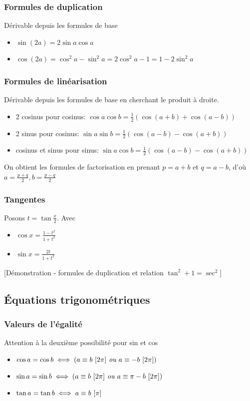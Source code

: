 \documentclass[openany]{book}
\begin{document}
\subsubsection{Formules de duplication}
Dérivable depuis les formules de base
\begin{itemize}
    \item $ \sin{(2a)} = 2\sin{a}\cos{a} $
    \item $ \cos{(2a)} = \cos^2{a} - \sin^2{a} = 2\cos^2{a} -1 = 1- 2\sin^2{a} $
\end{itemize}

\subsubsection{Formules de linéarisation}
Dérivable depuis les formules de base en cherchant le produit à droite.
\begin{itemize}
    \item 2 cosinus pour cosinus: $ \cos{a}\cos{b} = \frac{1}{2}(\cos{(a+b)}+\cos{(a-b)})  $
    \item 2 sinus pour cosinus: $ \sin{a}\sin{b} = \frac{1}{2}(\cos{(a-b)}-\cos{(a+b)}) $
    \item cosinus et sinus pour sinus: $ \sin{a}\cos{b} = \frac{1}{2}(\cos{(a-b)}-\cos{(a+b)}) $
\end{itemize}

On obtient les formules de factorisation en prenant $ p = a+b $ et $ q = a-b $, d'où $ a = \frac{p+q}{2}, b = \frac{p-q}{2} $

\subsubsection{Tangentes}
Posons $ t=\tan{\frac{x}{2}} $. Avec 
\begin{itemize}
    \item $ \cos{x} = \frac{1-t^2}{1+t^2} $
    \item $ \sin{x} = \frac{2t}{1+t^2} $
\end{itemize}

[Démonstration - formules de duplication et relation $\tan^2+1=\sec^2$]

\subsection{Équations trigonométriques}
\subsubsection{Valeurs de l'égalité}
Attention à la deuxième possibilité pour sin et cos
\begin{itemize}
    \item $ \cos{a} = \cos{b} \iff (a \equiv b \text{ } [2\pi] \textit{ ou } a \equiv -b \text{ } [2\pi]) $
    \item $ \sin{a} = \sin{b} \iff (a \equiv b \text{ } [2\pi] \textit{ ou } a \equiv \pi-b \text{ } [2\pi]) $
    \item $ \tan{a} = \tan{b} \iff a \equiv b \text{ } [\pi] $
\end{itemize}
\end{document}
